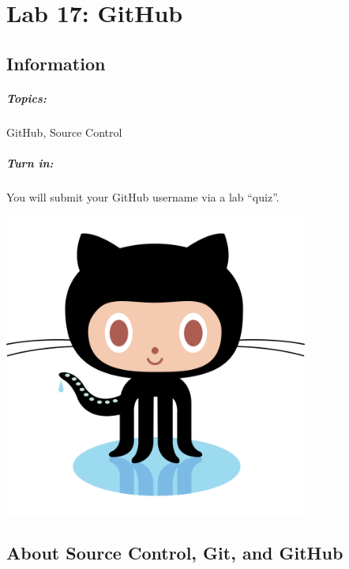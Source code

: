 \documentclass[a4paper,12pt,oneside]{book}
\title{}
\author{Rachel Morris}
\date{\today}
\newcommand{\laLab}{Lab 17: GitHub\ }
\begin{document}
    \chapter*{\laLab} 

        \section{Information}
            \paragraph{ Topics: } GitHub, Source Control
            \paragraph{ Turn in: } You will submit your GitHub username via a lab ``quiz''.


        \begin{center}
            \includegraphics[width=10cm]{images/octocat.png}
        \end{center}

        \tableofcontents
            

    \newpage

    \section{About Source Control, Git, and GitHub}
\end{document}
